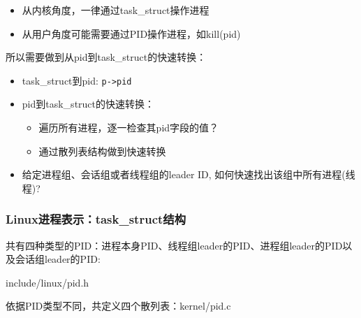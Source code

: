 \documentclass[xcolor=svgnames]{beamer}
\begin{document}
\begin{CJK*}{UTF8}{gbsn}
\begin{frame}[fragile]
\begin{itemize}
\item 从内核角度，一律通过task\_struct操作进程
\item 从用户角度可能需要通过PID操作进程，如kill(pid)
\end{itemize}

所以需要做到从pid到task\_struct的快速转换：

\begin{itemize}
\item task\_struct到pid: \verb|p->pid|
\item pid到task\_struct的快速转换：
\begin{itemize}
\item 遍历所有进程，逐一检查其pid字段的值？
\item 通过散列表结构做到快速转换
\end{itemize}
\item 给定进程组、会话组或者线程组的leader ID, 如何快速找出该组中所有进程(线程)?
\end{itemize}

\end{frame}

\begin{frame}[fragile]
\frametitle{Linux进程表示：task\_struct结构}
共有四种类型的PID：进程本身PID、线程组leader的PID、进程组leader的PID以及会话组leader的PID:
\begin{block}{include/linux/pid.h}
\lstpidtype
\end{block}
\begin{block}{依据PID类型不同，共定义四个散列表：kernel/pid.c}
\lstpidhashhaha
\end{block}
\end{frame}


\end{CJK*}
\end{document}
